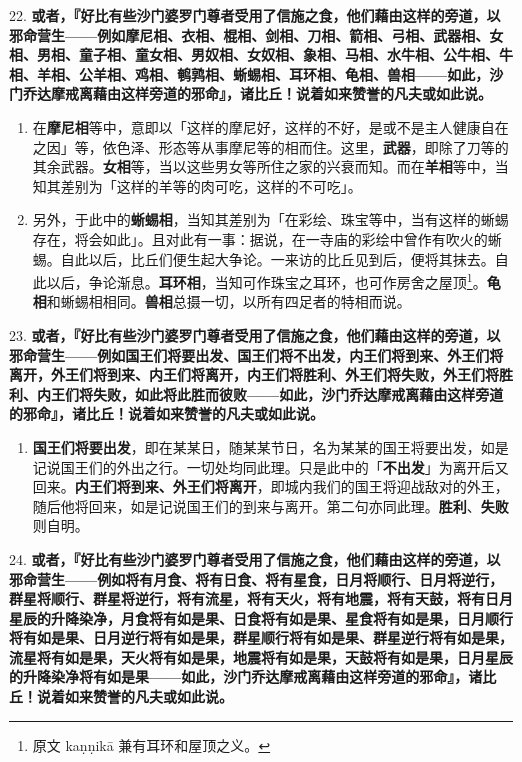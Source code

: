 {\Large 22.} \textbf{或者，『好比有些沙门婆罗门尊者受用了信施之食，他们藉由这样的旁道，以邪命营生——例如摩尼相、衣相、棍相、剑相、刀相、箭相、弓相、武器相、女相、男相、童子相、童女相、男奴相、女奴相、象相、马相、水牛相、公牛相、牛相、羊相、公羊相、鸡相、鹌鹑相、蜥蜴相、耳环相、龟相、兽相——如此，沙门乔达摩戒离藉由这样旁道的邪命』，诸比丘！说着如来赞誉的凡夫或如此说。}

\begin{enumerate}\item 在\textbf{摩尼相}等中，意即以「这样的摩尼好，这样的不好，是或不是主人健康自在之因」等，依色泽、形态等从事摩尼等的相而住。这里，\textbf{武器}，即除了刀等的其余武器。\textbf{女相}等，当以这些男女等所住之家的兴衰而知。而在\textbf{羊相}等中，当知其差别为「这样的羊等的肉可吃，这样的不可吃」。
\item 另外，于此中的\textbf{蜥蜴相}，当知其差别为「在彩绘、珠宝等中，当有这样的蜥蜴存在，将会如此」。且对此有一事：据说，在一寺庙的彩绘中曾作有吹火的蜥蜴。自此以后，比丘们便生起大争论。一来访的比丘见到后，便将其抹去。自此以后，争论渐息。\textbf{耳环相}，当知可作珠宝之耳环，也可作房舍之屋顶\footnote{原文 kaṇṇikā 兼有耳环和屋顶之义。}。\textbf{龟相}和蜥蜴相相同。\textbf{兽相}总摄一切，以所有四足者的特相而说。\end{enumerate}

{\Large 23.} \textbf{或者，『好比有些沙门婆罗门尊者受用了信施之食，他们藉由这样的旁道，以邪命营生——例如国王们将要出发、国王们将不出发，内王们将到来、外王们将离开，外王们将到来、内王们将离开，内王们将胜利、外王们将失败，外王们将胜利、内王们将失败，如此将此胜而彼败——如此，沙门乔达摩戒离藉由这样旁道的邪命』，诸比丘！说着如来赞誉的凡夫或如此说。}

\begin{enumerate}\item \textbf{国王们将要出发}，即在某某日，随某某节日，名为某某的国王将要出发，如是记说国王们的外出之行。一切处均同此理。只是此中的「\textbf{不出发}」为离开后又回来。\textbf{内王们将到来、外王们将离开}，即城内我们的国王将迎战敌对的外王，随后他将回来，如是记说国王们的到来与离开。第二句亦同此理。\textbf{胜利}、\textbf{失败}则自明。\end{enumerate}

{\Large 24.} \textbf{或者，『好比有些沙门婆罗门尊者受用了信施之食，他们藉由这样的旁道，以邪命营生——例如将有月食、将有日食、将有星食，日月将顺行、日月将逆行，群星将顺行、群星将逆行，将有流星，将有天火，将有地震，将有天鼓，将有日月星辰的升降染净，月食将有如是果、日食将有如是果、星食将有如是果，日月顺行将有如是果、日月逆行将有如是果，群星顺行将有如是果、群星逆行将有如是果，流星将有如是果，天火将有如是果，地震将有如是果，天鼓将有如是果，日月星辰的升降染净将有如是果——如此，沙门乔达摩戒离藉由这样旁道的邪命』，诸比丘！说着如来赞誉的凡夫或如此说。}

